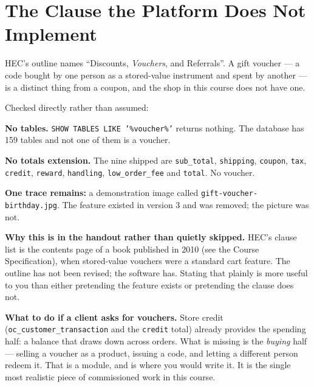 \section{The Clause the Platform Does Not Implement}

HEC's outline names ``Discounts, \emph{Vouchers}, and Referrals''. A gift
voucher --- a code bought by one person as a stored-value instrument and spent
by another --- is a distinct thing from a coupon, and the shop in this course
does not have one.

\begin{alertbox}
Checked directly rather than assumed:

\begin{tight}
  \item \textbf{No tables.} \texttt{SHOW TABLES LIKE '\%voucher\%'} returns
        nothing. The database has 159 tables and not one of them is a voucher.
  \item \textbf{No totals extension.} The nine shipped are \texttt{sub\_total},
        \texttt{shipping}, \texttt{coupon}, \texttt{tax}, \texttt{credit},
        \texttt{reward}, \texttt{handling}, \texttt{low\_order\_fee} and
        \texttt{total}. No voucher.
  \item \textbf{One trace remains:} a demonstration image called
        \texttt{gift-voucher-birthday.jpg}. The feature existed in version 3
        and was removed; the picture was not.
\end{tight}

\smallskip
\textbf{Why this is in the handout rather than quietly skipped.} HEC's clause
list is the contents page of a book published in 2010 (see the Course
Specification), when stored-value vouchers were a standard cart feature. The
outline has not been revised; the software has. Stating that plainly is more
useful to you than either pretending the feature exists or pretending the
clause does not.

\smallskip
\textbf{What to do if a client asks for vouchers.} Store credit
(\texttt{oc\_customer\_transaction} and the \texttt{credit} total) already
provides the spending half: a balance that draws down across orders. What is
missing is the \emph{buying} half --- selling a voucher as a product, issuing a
code, and letting a different person redeem it. That is a module, and
 is where you would write it. It is the single most realistic
piece of commissioned work in this course.
\end{alertbox}

